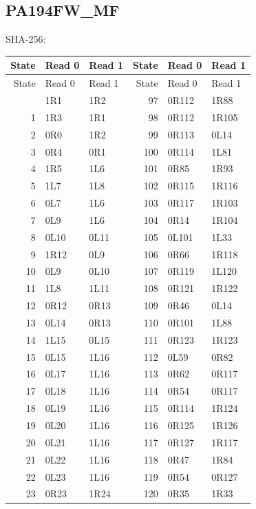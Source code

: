 \subsection{PA194FW\_MF}
\noindent\footnotesize SHA-256: \par
\begingroup\small\setlength{\tabcolsep}{12pt}
\begin{longtable}{rll@{\qquad}rll}
\toprule State & Read 0 & Read 1 & State & Read 0 & Read 1\\
\midrule\endfirsthead
\toprule State & Read 0 & Read 1 & State & Read 0 & Read 1\\
\midrule\endhead
\bottomrule\endfoot
0 & 1R1 & 1R2 & 97 & 0R112 & 1R88\\
1 & 1R3 & 1R1 & 98 & 0R112 & 1R105\\
2 & 0R0 & 1R2 & 99 & 0R113 & 0L14\\
3 & 0R4 & 0R1 & 100 & 0R114 & 1L81\\
4 & 1R5 & 1L6 & 101 & 0R85 & 1R93\\
5 & 1L7 & 1L8 & 102 & 0R115 & 1R116\\
6 & 0L7 & 1L6 & 103 & 0R117 & 1R103\\
7 & 0L9 & 1L6 & 104 & 0R14 & 1R104\\
8 & 0L10 & 0L11 & 105 & 0L101 & 1L33\\
9 & 1R12 & 0L9 & 106 & 0R66 & 1R118\\
10 & 0L9 & 0L10 & 107 & 0R119 & 1L120\\
11 & 1L8 & 1L11 & 108 & 0R121 & 1R122\\
12 & 0R12 & 0R13 & 109 & 0R46 & 0L14\\
13 & 0L14 & 0R13 & 110 & 0R101 & 1L88\\
14 & 1L15 & 0L15 & 111 & 0R123 & 1R123\\
15 & 0L15 & 1L16 & 112 & 0L59 & 0R82\\
16 & 0L17 & 1L16 & 113 & 0R62 & 0R117\\
17 & 0L18 & 1L16 & 114 & 0R54 & 0R117\\
18 & 0L19 & 1L16 & 115 & 0R114 & 1R124\\
19 & 0L20 & 1L16 & 116 & 0R125 & 1R126\\
20 & 0L21 & 1L16 & 117 & 0R127 & 1R117\\
21 & 0L22 & 1L16 & 118 & 0R47 & 1R84\\
22 & 0L23 & 1L16 & 119 & 0R54 & 0R127\\
23 & 0R23 & 1R24 & 120 & 0R35 & 1R33\\

\end{longtable}
